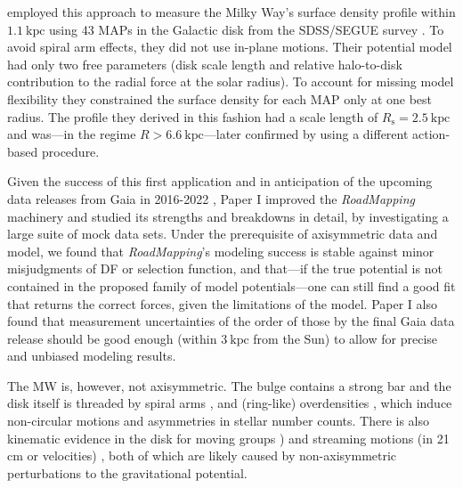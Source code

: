 \documentclass[iop,revtex4,numberedappendix,appendixfloats]{emulateapj}
\newcommand{\RM}{{\sl RoadMapping}}
\begin{document}
\citet{2013ApJ...779..115B} employed this approach to measure the Milky Way's surface density profile within $1.1~\text{kpc}$ using 43 MAPs in the Galactic disk from the SDSS/SEGUE survey \citep{2009AJ....137.4377Y}. To avoid spiral arm effects, they did not use in-plane motions. Their potential model had only two free parameters (disk scale length and relative halo-to-disk contribution to the radial force at the solar radius). To account for missing model flexibility they constrained the surface density for each MAP only at one best radius. The profile they derived in this fashion had a scale length of $R_\text{s}=2.5~\text{kpc}$ and was---in the regime $R>6.6~\text{kpc}$---later confirmed by \citet{2014MNRAS.445.3133P} using a different action-based procedure.

Given the success of this first application and in anticipation of the upcoming data releases from Gaia in 2016-2022 \citep{2013CEAB...37..115E}, Paper I improved the \RM{} machinery and studied its strengths and breakdowns in detail, by investigating a large suite of mock data sets. Under the prerequisite of axisymmetric data and model, we found that \RM{}'s modeling success is stable against minor misjudgments of DF or selection function, and that---if the true potential is not contained in the proposed family of model potentials---one can still find a good fit that returns the correct forces, given the limitations of the model. Paper I also found that measurement uncertainties of the order of those by the final Gaia data release should be good enough (within $3~\text{kpc}$ from the Sun) to allow for precise and unbiased modeling results. 

The MW is, however, not axisymmetric. The bulge contains a strong bar \citep{1980ApJ...236..779L,1991ApJ...379..631B,1991MNRAS.252..210B,1997MNRAS.288..365B,2000MNRAS.317L..45H,2013MNRAS.435.1874W} and the disk itself is threaded by spiral arms \citep{1958MNRAS.118..379O,1976A&A....49...57G,2009PASP..121..213C,2014ApJ...783..130R}, and (ring-like) overdensities \citep{2002ApJ...569..245N,2008ApJ...673..864J,2015ApJ...801..105X}, which induce non-circular motions and asymmetries in stellar number counts. There is also kinematic evidence in the disk for moving groups \citep{1998AJ....115.2384D,2005A&A...430..165F,2009ApJ...700.1794B,2010ApJ...717..617B}) and streaming motions (in 21 cm or velocities) \citep{2015ApJ...800...83B,2013MNRAS.436..101W,2012MNRAS.425.2335S}, both of which are likely caused by non-axisymmetric perturbations to the gravitational potential.
\end{document}
